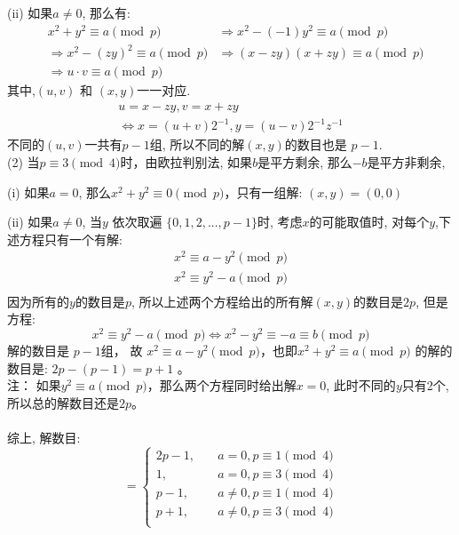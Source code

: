 \documentclass[11pt,a4paper]{article}
\begin{document}
\begin{CJK}{UTF8}{gbsn}
(ii) 如果$a\ne 0$, 那么有:
\begin{eqnarray*}
&x^2+y^2 \equiv a \pmod{p} & \Longrightarrow x^2 - (-1)y^2 \equiv a \pmod{p}\\
&\Longrightarrow x^2 - (zy)^2 \equiv a \pmod{p} & \Longrightarrow (x-zy)(x+zy) \equiv a \pmod{p}\\
&\Longrightarrow u\cdot v \equiv a \pmod{p}
\end{eqnarray*}
其中,$(u,v)$ 和 $(x,y)$一一对应.
\begin{eqnarray*}
	u=x-zy,v=x+zy \\
	\Longleftrightarrow x=(u+v)2^{-1}, y=(u-v)2^{-1}z^{-1}
\end{eqnarray*}
不同的$(u,v)$一共有$p-1$组, 所以不同的解$(x,y)$的数目也是 $p-1$.
\\
(2) 当$p\equiv3 \pmod{4}$时，由欧拉判别法, 如果$b$是平方剩余, 那么$-b$是平方非剩余,

(i) 如果$a=0$, 那么$x^2+y^2 \equiv 0 \pmod p$，只有一组解: $(x,y)=(0,0)$

(ii) 如果$a\ne 0$, 当$y$ 依次取遍 $\{0,1,2,...,p-1\}$时, 考虑$x$的可能取值时, 对每个$y$,下述方程只有一个有解:\\
\begin{eqnarray*}
	x^2 \equiv a - y^2 \pmod p \\
	x^2 \equiv y^2 - a \pmod p \\
\end{eqnarray*}
因为所有的$y$的数目是$p$, 所以上述两个方程给出的所有解$(x,y)$的数目是$2p$, 但是方程:\\
$$x^2 \equiv y^2 - a \pmod p \Longleftrightarrow x^2 - y^2 \equiv - a \equiv b\pmod p$$
解的数目是 $p-1$组， 故 $x^2 \equiv a - y^2 \pmod p$，也即$x^2 +  y^2\equiv a  \pmod p$ 的解的数目是: $2p-(p-1) = p+1$ 。\\
注： 如果$y^2 \equiv a \pmod p$，那么两个方程同时给出解$x=0$, 此时不同的$y$只有2个,所以总的解数目还是$2p$。\\
\\
综上, 解数目:
$$ =\left\{
\begin{aligned}
2p-1, & \quad a=0, p \equiv 1 \pmod 4 \\
1, &\quad  a=0, p \equiv 3 \pmod 4 \\
p-1, &\quad  a\ne 0, p \equiv 1 \pmod 4 \\
p+1, &\quad  a\ne 0, p \equiv 3 \pmod 4 \\
\end{aligned}
\right.
$$

\end{CJK}
\newpage
\end{document}
